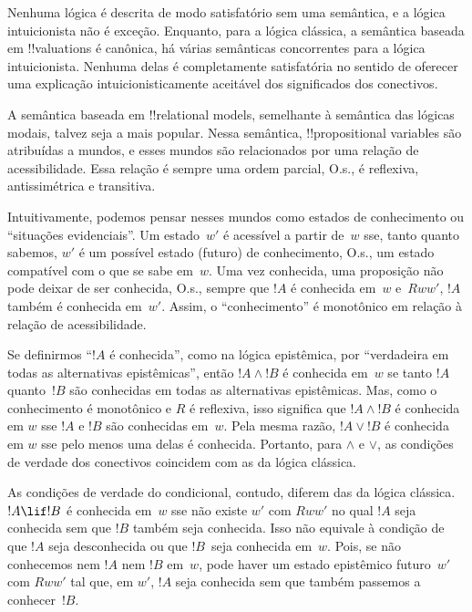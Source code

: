 \documentclass[../../../include/open-logic-section]{subfiles}
\begin{document}


Nenhuma lógica é descrita de modo satisfatório sem uma semântica, e a
lógica intuicionista não é exceção. Enquanto, para a lógica clássica,
a semântica baseada em !!{valuation}s é canônica, há várias semânticas
concorrentes para a lógica intuicionista. Nenhuma delas é completamente
satisfatória no sentido de oferecer uma explicação intuicionisticamente
aceitável dos significados dos conectivos.

A semântica baseada em !!{relational model}s, semelhante à semântica
das lógicas modais, talvez seja a mais popular. Nessa semântica,
!!{propositional variable}s são atribuídas a mundos, e esses mundos
são relacionados por uma relação de acessibilidade. Essa relação é
sempre uma ordem parcial, O.s.\@, é reflexiva, antissimétrica e
transitiva.

Intuitivamente, podemos pensar nesses mundos como estados de
conhecimento ou ``situações evidenciais''. Um estado~$w'$ é acessível
a partir de~$w$ sse, tanto quanto sabemos, $w'$ é um possível estado
(futuro) de conhecimento, O.s.\@, um estado compatível com o que se
sabe em~$w$. Uma vez conhecida, uma proposição não pode deixar de ser
conhecida, O.s.\@, sempre que $!A$ é conhecida em~$w$ e~$Rww'$, $!A$ também é
conhecida em~$w'$. Assim, o ``conhecimento'' é monotônico em relação à
relação de acessibilidade.

Se definirmos ``$!A$ é conhecida'', como na lógica epistêmica, por
``verdadeira em todas as alternativas epistêmicas'', então
$!A \land !B$ é conhecida em~$w$ se tanto $!A$ quanto~$!B$ são
conhecidas em todas as alternativas epistêmicas. Mas, como o
conhecimento é monotônico e $R$ é reflexiva, isso significa que
$!A \land !B$ é conhecida em $w$ sse $!A$ e $!B$ são conhecidas
em~$w$. Pela mesma razão, $!A \lor !B$ é conhecida em $w$ sse pelo
menos uma delas é conhecida. Portanto, para $\land$ e $\lor$, as
condições de verdade dos conectivos coincidem com as da lógica clássica.

As condições de verdade do condicional, contudo, diferem das da lógica
clássica. $!A \lif !B$ é conhecida em~$w$ sse não existe $w'$ com
$Rww'$ no qual $!A$ seja conhecida sem que $!B$ também seja conhecida.
Isso não equivale à condição de que $!A$ seja desconhecida ou que
$!B$~seja conhecida em~$w$. Pois, se não conhecemos nem $!A$ nem $!B$
em~$w$, pode haver um estado epistêmico futuro~$w'$ com $Rww'$ tal que,
em $w'$, $!A$ seja conhecida sem que também passemos a conhecer~$!B$.
\end{document}
